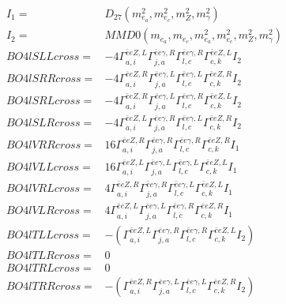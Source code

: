 \documentclass[A4,landscape]{article}
\begin{document}
\begin{align} 
I_1 = & D_{27}(m^2_{e_{{a}}}, m^2_{e_{{c}}}, m^2_{Z}, m^2_{\gamma}) \\ 
I_2 = & MMD0(m_{e_{{a}}}, m_{e_{{c}}}, m^2_{e_{{a}}}, m^2_{e_{{c}}}, m^2_{Z}, m^2_{\gamma}) \\ 
  BO4lSLLcross= & -4  \Gamma^{\bar{e}e Z ,L}_{a, i} \Gamma^{\bar{e}e \gamma ,R}_{j, a} \Gamma^{\bar{e}e \gamma ,R}_{l, c} \Gamma^{\bar{e}e Z ,L}_{c, k} I_2 \\ 
  BO4lSRRcross= & -4  \Gamma^{\bar{e}e Z ,R}_{a, i} \Gamma^{\bar{e}e \gamma ,L}_{j, a} \Gamma^{\bar{e}e \gamma ,L}_{l, c} \Gamma^{\bar{e}e Z ,R}_{c, k} I_2 \\ 
  BO4lSRLcross= & -4  \Gamma^{\bar{e}e Z ,R}_{a, i} \Gamma^{\bar{e}e \gamma ,L}_{j, a} \Gamma^{\bar{e}e \gamma ,R}_{l, c} \Gamma^{\bar{e}e Z ,L}_{c, k} I_2 \\ 
  BO4lSLRcross= & -4  \Gamma^{\bar{e}e Z ,L}_{a, i} \Gamma^{\bar{e}e \gamma ,R}_{j, a} \Gamma^{\bar{e}e \gamma ,L}_{l, c} \Gamma^{\bar{e}e Z ,R}_{c, k} I_2 \\ 
  BO4lVRRcross= & 16  \Gamma^{\bar{e}e Z ,R}_{a, i} \Gamma^{\bar{e}e \gamma ,R}_{j, a} \Gamma^{\bar{e}e \gamma ,R}_{l, c} \Gamma^{\bar{e}e Z ,R}_{c, k} I_1 \\ 
  BO4lVLLcross= & 16  \Gamma^{\bar{e}e Z ,L}_{a, i} \Gamma^{\bar{e}e \gamma ,L}_{j, a} \Gamma^{\bar{e}e \gamma ,L}_{l, c} \Gamma^{\bar{e}e Z ,L}_{c, k} I_1 \\ 
  BO4lVRLcross= & 4  \Gamma^{\bar{e}e Z ,R}_{a, i} \Gamma^{\bar{e}e \gamma ,R}_{j, a} \Gamma^{\bar{e}e \gamma ,L}_{l, c} \Gamma^{\bar{e}e Z ,L}_{c, k} I_1 \\ 
  BO4lVLRcross= & 4  \Gamma^{\bar{e}e Z ,L}_{a, i} \Gamma^{\bar{e}e \gamma ,L}_{j, a} \Gamma^{\bar{e}e \gamma ,R}_{l, c} \Gamma^{\bar{e}e Z ,R}_{c, k} I_1 \\ 
  BO4lTLLcross= & -( \Gamma^{\bar{e}e Z ,L}_{a, i} \Gamma^{\bar{e}e \gamma ,R}_{j, a} \Gamma^{\bar{e}e \gamma ,R}_{l, c} \Gamma^{\bar{e}e Z ,L}_{c, k} I_2) \\ 
  BO4lTLRcross= & 0 \\ 
  BO4lTRLcross= & 0 \\ 
  BO4lTRRcross= & -( \Gamma^{\bar{e}e Z ,R}_{a, i} \Gamma^{\bar{e}e \gamma ,L}_{j, a} \Gamma^{\bar{e}e \gamma ,L}_{l, c} \Gamma^{\bar{e}e Z ,R}_{c, k} I_2) \\ 
\end{align} 
\end{document}
